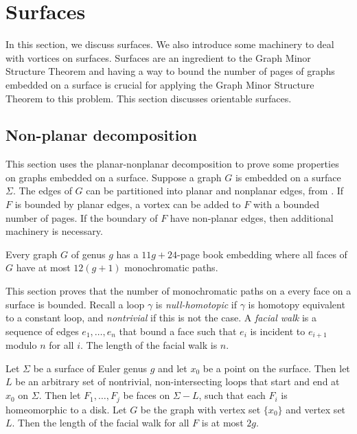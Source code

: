 
\section{Surfaces}
In this section, we discuss surfaces. We also introduce some machinery to deal with vortices on surfaces. Surfaces are an ingredient to the Graph Minor Structure Theorem and having a way to bound the number of pages of graphs embedded on a surface is crucial for applying the Graph Minor Structure Theorem to this problem. This section discusses orientable surfaces.
\subsection{Non-planar decomposition}

This section uses the planar-nonplanar decomposition to prove some properties on graphs embedded on a surface. Suppose a graph \(G\) is embedded on a surface $\Sigma$. The edges of $G$ can be partitioned into planar and nonplanar edges, from \textcite{heathPagenumberGenusGraphs1992}. If \(F\) is bounded by planar edges, a vortex can be added to \(F\) with a bounded number of pages. If the boundary of $F$ have non-planar edges, then additional machinery is necessary.
\begin{theorem}
	Every graph \(G\) of genus \(g\) has a \(11g + 24\)-page book embedding where all faces of $G$ have at most \( 12(g + 1)\) monochromatic paths.
\end{theorem}

This section proves that the number of monochromatic paths on a every face on a surface is bounded. Recall a loop $\gamma$ is \textit{null-homotopic} if $\gamma$ is homotopy equivalent to a constant loop, and \textit{nontrivial} if this is not the case. A \textit{facial walk} is a sequence of edges \(e_1, \ldots, e_n\) that bound a face such that \(e_i\) is incident to \(e_{i + 1}\) modulo \(n\) for all \(i\). The length of the facial walk is \(n\).

\begin{lemma}\label{lem:orientable_facial_walks}
	Let \(\Sigma \) be a surface of Euler genus \(g\) and let \(x_0\) be a point on the surface. Then let \(L\) be an arbitrary set of nontrivial, non-intersecting loops that start and end at \(x_0\) on \(\Sigma \). Then let \(F_1, \ldots, F_j\) be faces on \(\Sigma - L\), such that each \(F_i\) is homeomorphic to a disk. Let $G$ be the graph with vertex set $\{x_0 \}$ and vertex set $L$. Then the length of the facial walk for all \(F\) is at most \(2g\).
\end{lemma}

